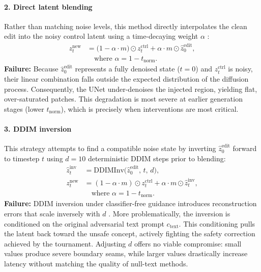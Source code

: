 \paragraph{2. Direct latent blending}
Rather than matching noise levels, this method directly interpolates the clean edit into the noisy control latent using a time-decaying weight $\alpha$ \citep{avrahami2022blended}:
\begin{align*}
  z_t^{\mathrm{new}} &= \bigl(1 - \alpha \cdot m\bigr)\odot z_t^{\mathrm{ctrl}} + \alpha \cdot m \odot \hat{z}_0^{\mathrm{edit}}, \\
  &\quad \text{where } \alpha = 1 - t_{\mathrm{norm}}.
\end{align*}
\textbf{Failure:} Because $\hat{z}_0^{\mathrm{edit}}$ represents a fully denoised state ($t{=}0$) and $z_t^{\mathrm{ctrl}}$ is noisy, their linear combination falls outside the expected distribution of the diffusion process. Consequently, the UNet under-denoises the injected region, yielding flat, over-saturated patches. This degradation is most severe at earlier generation stages (lower $t_{\mathrm{norm}}$), which is precisely when \guardpaint{} interventions are most critical.

\paragraph{3. DDIM inversion}
This strategy attempts to find a compatible noise state by inverting $\hat{z}_0^{\mathrm{edit}}$ forward to timestep $t$ using $d{=}10$ deterministic DDIM steps \citep{song2020denoising} prior to blending:
\begin{align*}
  \hat{z}_t^{\mathrm{inv}} &= \mathrm{DDIMInv}\!\bigl(\hat{z}_0^{\mathrm{edit}},\,t,\,d\bigr), \\
  z_t^{\mathrm{new}} &= (1-\alpha\cdot m)\odot z_t^{\mathrm{ctrl}} + \alpha\cdot m \odot \hat{z}_t^{\mathrm{inv}}, \\
  &\quad \text{where } \alpha = 1-t_{\mathrm{norm}}.
\end{align*}
\textbf{Failure:} DDIM inversion under classifier-free guidance introduces reconstruction errors that scale inversely with $d$ \citep{mokady2023null}. More problematically, the inversion is conditioned on the original adversarial text prompt $c_{\mathrm{text}}$. This conditioning pulls the latent back toward the unsafe concept, actively fighting the safety correction achieved by the tournament. Adjusting $d$ offers no viable compromise: small values produce severe boundary seams, while larger values drastically increase latency without matching the quality of null-text methods.

